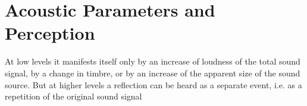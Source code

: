 \section{Acoustic Parameters and Perception}\label{ch:acoustics:sec:perception}
At low levels it manifests itself only by an increase of loudness of the total sound signal, by a change in timbre, or by an increase of the apparent size of the sound source. But at higher levels a reflection can be heard as a separate event, i.e. as a repetition of the original sound signal

